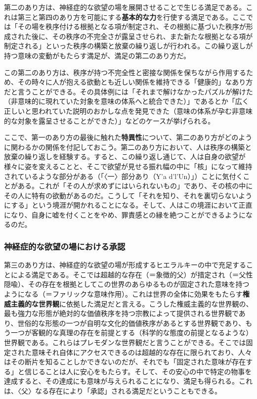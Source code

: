 第二のあり方は、神経症的な欲望の場を展開させることで生じる満足である。これは第三と第四のあり方を可能にする\textbf{基本的な力}を行使する満足である。ここでは「その場を秩序付ける根拠となる項が制定され、その根拠に基づいた秩序が形成された後に、その秩序の不完全さが露呈させられ、また新たな根拠となる項が制定される」といった秩序の構築と放棄の繰り返しが行われる。この繰り返しが持つ意味の変動がもたらす満足が、満足の第二のあり方だ。

この第二のあり方は、秩序が持つ不完全性と密接な関係を保ちながら作用するため、その時々に人が抱える欲動とも近しい関係を維持できる「健康的」なあり方だと言うことができる。その具体例には「それまで解けなかったパズルが解けた（非意味的に現れていた対象を意味の体系へと統合できた）」であるとか「広く正しいと思われていた説明のおかしな点を発見できた（意味の体系が孕む非意味的な対象を露呈させることができた）」などのケースが挙げられる。

ここで、第一のあり方の最後に触れた\textbf{特異性}について、第二のあり方がどのように関わるかの関係を付記しておこう。第二のあり方において、人は秩序の構築と放棄の繰り返しを経験する。すると、この繰り返し通じて、人は自身の欲望が様々に姿を変えることと、そこで欲望が見せる振れ幅の中に「核」になって維持されているような部分がある（「〈一〉部分あり（Y'a
d'l'Un）」）ことに気付くことがある。これが「その人が求めずにはいられないもの」であり、その核の中にその人に特有の欲動があるのだ。こうして「それを知り、それを裏切らないようにする」という境涯が開かれることになる。そして、人はこの境涯において正直になり、自身に嘘を付くことをやめ、罪責感との縁を絶つことができるようになるのだ。

\subsubsection{神経症的な欲望の場における承認}\label{ux795eux7d4cux75c7ux7684ux306aux6b32ux671bux306eux5834ux306bux304aux3051ux308bux627fux8a8d}

第三のあり方は、神経症的な欲望の場が形成するヒエラルキーの中で充足することによる満足である。そこでは超越的な存在（＝象徴的父）が措定され（＝父性隠喩）、その存在を根拠としてこの世界のあらゆるものが固定された意味を持つようになる（＝ファリックな意味作用）。これは世界の全体に効果をもたらす\textbf{権威主義的な世界観}に依拠した満足だと言える。こうした権威主義的な世界観の、最も強力な形態が絶対的な価値秩序を持つ宗教によって提供される世界観であり、世俗的な形態の一つが自明な文化的価値秩序があるとする世界観であり、もう一つが客観的な真理の存在を前提とする（科学的な態度の前提となるような）世界観である。これらはプレモダンな世界観だと言うことができる。そこでは固定された意味それ自体にアクセスできるのは超越的な存在に限られており、人々はその断片を知ることしかできないのだが、それでも「固定された意味が存在する」と信じることは人に安心をもたらす。そして、その安心の中で特定の物事を達成すると、その達成にも意味が与えられることになり、満足も得られる。これは、〈父〉なる存在により「承認」される満足だということもできる。

